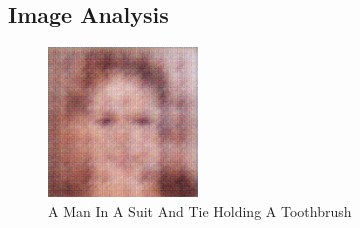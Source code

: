 \documentclass{article}%
\begin{document}
%
\subsection{Image Analysis}%
\label{subsec:ImageAnalysis}%


\begin{figure}[h!]%
\centering%
\includegraphics[width=150px]{500_fake_images/samples_5_65.png}%
\caption{A Man In A Suit And Tie Holding A Toothbrush}%
\end{figure}

%
\end{document}
